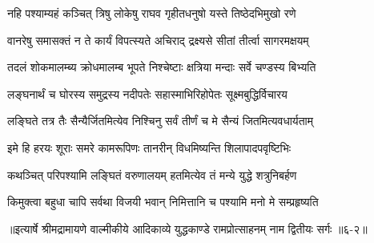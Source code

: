 \twolineshloka
{नहि पश्याम्यहं कञ्चित् त्रिषु लोकेषु राघव}
{गृहीतधनुषो यस्ते तिष्ठेदभिमुखो रणे} %

\twolineshloka
{वानरेषु समासक्तं न ते कार्यं विपत्स्यते}
{अचिराद् द्रक्ष्यसे सीतां तीर्त्वा सागरमक्षयम्} %

\twolineshloka
{तदलं शोकमालम्ब्य क्रोधमालम्ब भूपते}
{निश्चेष्टाः क्षत्रिया मन्दाः सर्वे चण्डस्य बिभ्यति} %

\twolineshloka
{लङ्घनार्थं च घोरस्य समुद्रस्य नदीपतेः}
{सहास्माभिरिहोपेतः सूक्ष्मबुद्धिर्विचारय} %

\twolineshloka
{लङ्घिते तत्र तैः सैन्यैर्जितमित्येव निश्चिनु}
{सर्वं तीर्णं च मे सैन्यं जितमित्यवधार्यताम्} %

\twolineshloka
{इमे हि हरयः शूराः समरे कामरूपिणः}
{तानरीन् विधमिष्यन्ति शिलापादपवृष्टिभिः} %

\twolineshloka
{कथञ्चित् परिपश्यामि लङ्घितं वरुणालयम्}
{हतमित्येव तं मन्ये युद्धे शत्रुनिबर्हण} %

\twolineshloka
{किमुक्त्वा बहुधा चापि सर्वथा विजयी भवान्}
{निमित्तानि च पश्यामि मनो मे सम्प्रहृष्यति} %


॥इत्यार्षे श्रीमद्रामायणे वाल्मीकीये आदिकाव्ये युद्धकाण्डे रामप्रोत्साहनम् नाम द्वितीयः सर्गः ॥६-२॥

